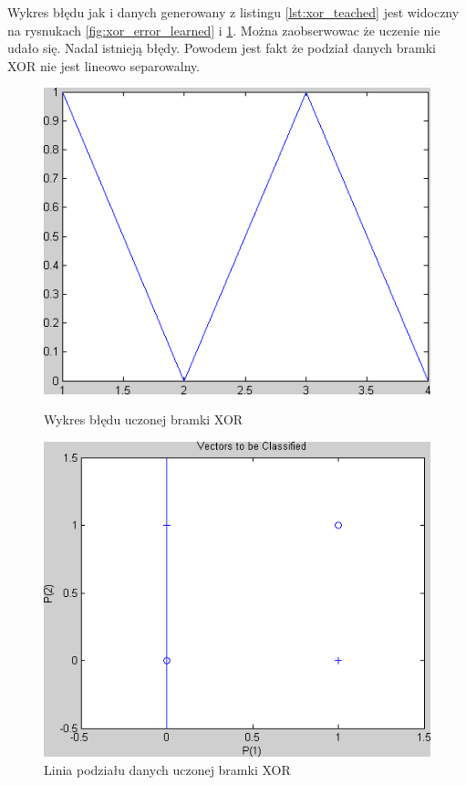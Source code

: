 \documentclass[pointlessnumbers, abstracton, headsepline, a4paper]{scrartcl}
\begin{document}
\begin{center}
\begin{minipage}{0.5\textwidth}
\lstset{captionpos=b,caption=Kod uczonej bramki XOR,label=lst:xor_teached}

\end{minipage}
\end{center}

Wykres błędu jak i danych generowany z listingu \ref{lst:xor_teached} jest widoczny na rysnukach \ref{fig:xor_error_learned} i \ref{fig:xor_data_learned}. Można zaobserwowac że uczenie nie udało się. Nadal istnieją błędy. Powodem jest fakt że podział danych bramki XOR nie jest lineowo separowalny.

\begin{figure}[h]
\centering
\begin{minipage}{0.4\textwidth}
\includegraphics[scale=0.4]{figures/xor_error_learned.png}
\caption{\label{fig:xor_error_learned}Wykres błędu uczonej bramki XOR}
\end{minipage}
\qquad
\begin{minipage}{0.4\textwidth}
\includegraphics[scale=0.4]{figures/xor_data_learned.png}
\caption{\label{fig:xor_data_learned}Linia podziału danych uczonej bramki XOR}
\end{minipage}
\end{figure}
\end{document}
